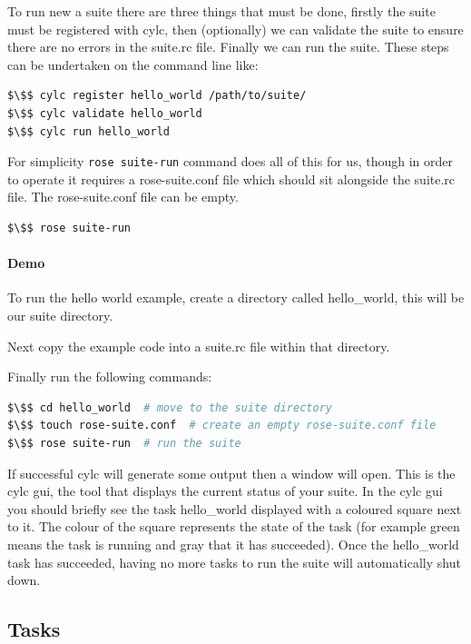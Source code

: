 To run new a suite there are three things that must be done, firstly the suite
must be registered with cylc, then (optionally) we can validate the suite to
ensure there are no errors in the suite.rc file. Finally we can run the suite.
These steps can be undertaken on the command line like:

\begin{lstlisting}[mathescape, language=bash]
$\$$ cylc register hello_world /path/to/suite/
$\$$ cylc validate hello_world
$\$$ cylc run hello_world
\end{lstlisting}

For simplicity \lstinline=rose suite-run= command does all of this for us,
though in order to operate it requires a rose-suite.conf file which should sit
alongside the suite.rc file. The rose-suite.conf file can be empty.

\begin{lstlisting}[mathescape, language=bash]
$\$$ rose suite-run
\end{lstlisting}

\paragraph*{Demo}
To run the hello world example, create a directory called hello\_world, this
will be our suite directory.

Next copy the example code into a suite.rc file within that directory.

Finally run the following commands:

\begin{lstlisting}[mathescape, language=bash]
$\$$ cd hello_world  # move to the suite directory
$\$$ touch rose-suite.conf  # create an empty rose-suite.conf file
$\$$ rose suite-run  # run the suite
\end{lstlisting}

If successful cylc will generate some output then a window will open. This is
the cylc gui, the tool that displays the current status of your suite. In the
cylc gui you should briefly see the task hello\_world displayed with a coloured
square next to it. The colour of the square represents the state of the task
(for example green means the task is running and gray that it has succeeded).
Once the hello\_world task has succeeded, having no more tasks to run the suite
will automatically shut down.


\subsection{Tasks}

